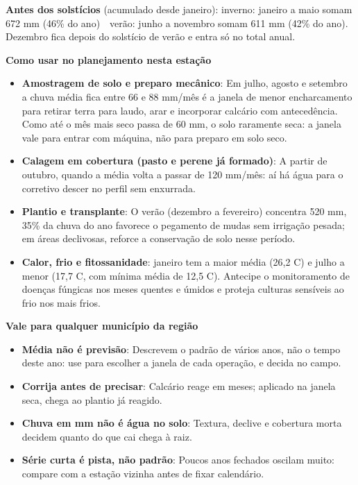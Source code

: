 \documentclass[10pt,a4paper]{article}
\begin{document}
\vspace{1pt}
{\footnotesize\textbf{Antes dos solstícios} (acumulado desde janeiro):
inverno: janeiro a maio somam 672 mm (46\% do ano) \,\textbullet\, verão: junho a novembro somam 611 mm (42\% do ano). Dezembro fica depois do solstício de verão e entra só no total
anual.}

\vspace{2pt}
{\bfseries\small Como usar no planejamento nesta estação}

\footnotesize\begin{itemize}\setlength{\itemsep}{0.5pt}
  \item \textbf{Amostragem de solo e preparo mecânico}: Em julho, agosto e setembro a chuva média fica entre 66 e 88 mm/mês \textemdash{} é a janela de menor encharcamento para retirar terra para laudo, arar e incorporar calcário com antecedência. Como até o mês mais seco passa de 60 mm, o solo raramente seca: a janela vale para entrar com máquina, não para preparo em solo seco.
  \item \textbf{Calagem em cobertura (pasto e perene já formado)}: A partir de outubro, quando a média volta a passar de 120 mm/mês: aí há água para o corretivo descer no perfil sem enxurrada.
  \item \textbf{Plantio e transplante}: O verão (dezembro a fevereiro) concentra 520 mm, 35\% da chuva do ano \textemdash{} favorece o pegamento de mudas sem irrigação pesada; em áreas declivosas, reforce a conservação de solo nesse período.
  \item \textbf{Calor, frio e fitossanidade}: janeiro tem a maior média (26,2 \textdegree{}C) e julho a menor (17,7 \textdegree{}C, com mínima média de 12,5 \textdegree{}C). Antecipe o monitoramento de doenças fúngicas nos meses quentes e úmidos e proteja culturas sensíveis ao frio nos mais frios.
\end{itemize}

\vspace{1pt}
{\bfseries\small Vale para qualquer município da região}

\scriptsize\begin{itemize}\setlength{\itemsep}{0.5pt}
  \item \textbf{Média não é previsão}: Descrevem o padrão de vários anos, não o tempo deste ano: use para escolher a janela de cada operação, e decida no campo.
  \item \textbf{Corrija antes de precisar}: Calcário reage em meses; aplicado na janela seca, chega ao plantio já reagido.
  \item \textbf{Chuva em mm não é água no solo}: Textura, declive e cobertura morta decidem quanto do que cai chega à raiz.
  \item \textbf{Série curta é pista, não padrão}: Poucos anos fechados oscilam muito: compare com a estação vizinha antes de fixar calendário.
\end{itemize}
\end{document}
